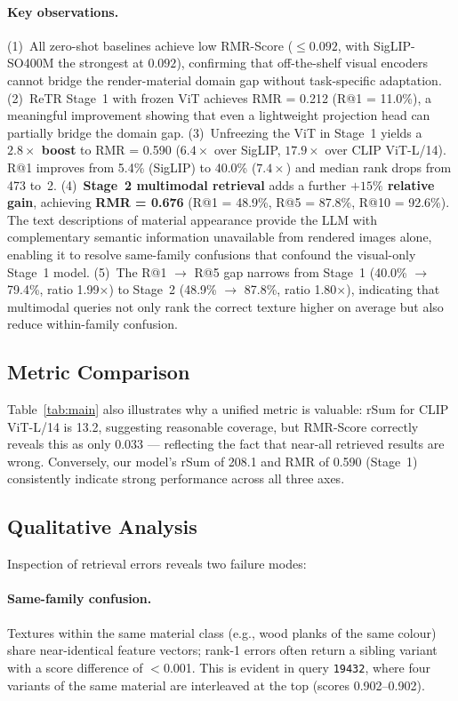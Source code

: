 \documentclass[10pt,twocolumn]{article}
\begin{document}
\paragraph{Key observations.}
(1)~All zero-shot baselines achieve low RMR-Score ($\leq 0.092$, with
SigLIP-SO400M the strongest at $0.092$), confirming that off-the-shelf
visual encoders cannot bridge the render-material domain gap without
task-specific adaptation.
(2)~ReTR Stage~1 with frozen ViT achieves RMR = 0.212 (R@1 = 11.0\%), a
meaningful improvement showing that even a lightweight projection head can
partially bridge the domain gap.
(3)~Unfreezing the ViT in Stage~1 yields a \textbf{$2.8\times$ boost} to
RMR = 0.590 ($6.4\times$ over SigLIP, $17.9\times$ over CLIP ViT-L/14).
R@1 improves from 5.4\% (SigLIP) to 40.0\% ($7.4\times$) and median rank
drops from 473 to~2.
(4)~\textbf{Stage~2 multimodal retrieval} adds a further \textbf{$+15\%$
relative gain}, achieving \textbf{RMR = 0.676} (R@1 = 48.9\%,
R@5 = 87.8\%, R@10 = 92.6\%).
The text descriptions of material appearance provide the LLM with
complementary semantic information unavailable from rendered images alone,
enabling it to resolve same-family confusions that confound the visual-only
Stage~1 model.
(5)~The R@1 $\to$ R@5 gap narrows from Stage~1 (40.0\% $\to$ 79.4\%, ratio
1.99$\times$) to Stage~2 (48.9\% $\to$ 87.8\%, ratio 1.80$\times$),
indicating that multimodal queries not only rank the correct texture higher
on average but also reduce within-family confusion.

\subsection{Metric Comparison}

Table~\ref{tab:main} also illustrates why a unified metric is valuable:
rSum for CLIP ViT-L/14 is 13.2, suggesting reasonable coverage, but
RMR-Score correctly reveals this as only 0.033 — reflecting the fact that
near-all retrieved results are wrong.
Conversely, our model's rSum of 208.1 and RMR of 0.590 (Stage~1) consistently
indicate strong performance across all three axes.

\subsection{Qualitative Analysis}

Inspection of retrieval errors reveals two failure modes:

\paragraph{Same-family confusion.}
Textures within the same material class (e.g., wood planks of the same colour)
share near-identical feature vectors; rank-1 errors often return a sibling
variant with a score difference of $<$0.001.
This is evident in query \texttt{19432}, where four variants of the same
material are interleaved at the top (scores 0.902–0.902).
\end{document}
